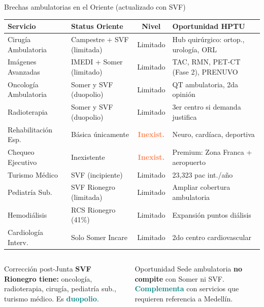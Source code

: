 \documentclass[aspectratio=169, 11pt]{beamer}
\newcommand{\highlight}[1]{\textcolor{teal}{\textbf{#1}}}
\newcommand{\danger}[1]{\textcolor{coral}{\textbf{#1}}}
\newcommand{\src}[1]{\par\vspace{2pt}{\tiny\textcolor{slate}{Fuente: #1}}}
\begin{document}
\begin{frame}{Brechas ambulatorias en el Oriente (actualizado con SVF)}
\vspace{-4pt}
{\tiny\setlength{\tabcolsep}{3pt}
\begin{tabular}{@{}p{3cm}p{3cm}cp{4.2cm}@{}}
\toprule
\textbf{Servicio} & \textbf{Status Oriente} & \textbf{Nivel} & \textbf{Oportunidad HPTU} \\
\midrule
\rowcolor{coral!8}
Cirugía Ambulatoria & Campestre + SVF (limitada) & Limitado & Hub quirúrgico: ortop., urología, ORL \\
Imágenes Avanzadas & IMEDI + Somer (limitado) & Limitado & TAC, RMN, PET-CT (Fase 2), PRENUVO \\
\rowcolor{coral!8}
Oncología Ambulatoria & Somer y SVF (duopolio) & Limitado & QT ambulatoria, 2da opinión \\
Radioterapia & Somer y SVF (duopolio) & Limitado & 3er centro si demanda justifica \\
\rowcolor{coral!8}
Rehabilitación Esp. & Básica únicamente & \danger{Inexist.} & Neuro, cardíaca, deportiva \\
Chequeo Ejecutivo & Inexistente & \danger{Inexist.} & Premium: Zona Franca + aeropuerto \\
\rowcolor{coral!8}
Turismo Médico & SVF (incipiente) & Limitado & 23,323 pac int./año \\
Pediatría Sub. & SVF Rionegro (limitada) & Limitado & Ampliar cobertura ambulatoria \\
Hemodiálisis & RCS Rionegro (41\%) & Limitado & Expansión puntos diálisis \\
Cardiología Interv. & Solo Somer Incare & Limitado & 2do centro cardiovascular \\
\bottomrule
\end{tabular}
}

\vspace{2pt}
\begin{columns}[T]
\begin{exampleblock}{\small Corrección post-Junta}
\scriptsize
\textbf{SVF Rionegro tiene:} oncología, radioterapia, cirugía, pediatría sub., turismo médico. Es \highlight{duopolio}.
\end{exampleblock}
\begin{alertblock}{\small Oportunidad}
\scriptsize
Sede ambulatoria \textbf{no compite} con Somer ni SVF. \highlight{Complementa} con servicios que requieren referencia a Medellín.
\end{alertblock}
\end{columns}
\src{REPS (b4dp-ximh), Google Places, Junta Directiva 16 marzo}
\end{frame}
\end{document}
